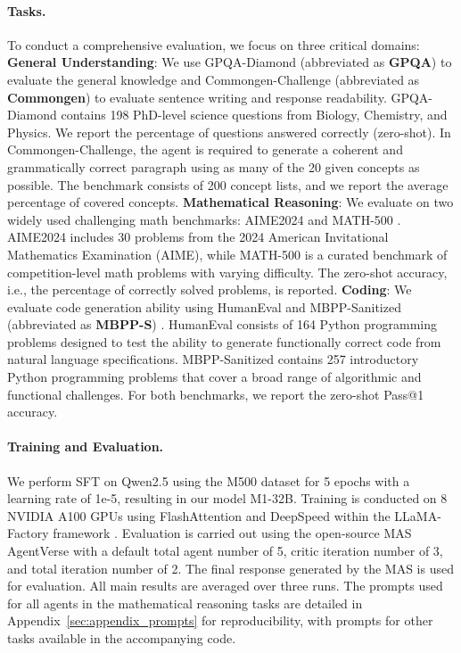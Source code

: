 \paragraph{Tasks.} To conduct a comprehensive evaluation, we focus on three critical domains:  \textbf{General Understanding}: We use GPQA-Diamond (abbreviated as \textbf{GPQA}) \citep{gpqa}  to evaluate the general knowledge and  Commongen-Challenge (abbreviated as \textbf{Commongen}) \citep{self-refine} to evaluate sentence writing and response readability.  GPQA-Diamond contains 198 PhD-level science questions from Biology, Chemistry, and Physics. We report the percentage of questions answered correctly (zero-shot). In Commongen-Challenge, the agent is required to generate a coherent and grammatically correct paragraph using as many of the 20 given concepts as possible. The benchmark consists of 200 concept lists, and we report the average percentage of covered concepts.  \textbf{Mathematical Reasoning}: We evaluate on two widely used challenging math benchmarks: AIME2024 \citep{aime2024} and MATH-500 \citep{math}. AIME2024 includes 30 problems from the 2024 American Invitational Mathematics Examination (AIME), while MATH-500 is a curated benchmark of competition-level math problems with varying difficulty. The zero-shot accuracy, i.e., the percentage of correctly solved problems, is reported.  \textbf{Coding}: We evaluate code generation ability using HumanEval \citep{humaneval} and MBPP-Sanitized (abbreviated as \textbf{MBPP-S}) \citep{mbpp}. HumanEval consists of 164 Python programming problems designed to test the ability to generate functionally correct code from natural language specifications. MBPP-Sanitized contains 257 introductory Python programming problems that cover a broad range of algorithmic and functional challenges. For both benchmarks, we report the zero-shot Pass@1 accuracy.

\paragraph{Training and Evaluation.} We perform SFT on Qwen2.5 using the M500 dataset for 5 epochs with a learning rate of 1e-5, resulting in our model M1-32B. Training is conducted on 8 NVIDIA A100 GPUs using FlashAttention \citep{flashattention} and DeepSpeed \citep{deepspeed} within the LLaMA-Factory framework \citep{llamafactory}. Evaluation is carried out using the open-source MAS AgentVerse with a default total agent number of 5, critic iteration number of 3, and total iteration number of 2. The final response generated by the MAS is used for evaluation. All main results are averaged over three runs. The prompts used for all agents in the mathematical reasoning tasks are detailed in Appendix~\ref{sec:appendix_prompts} for reproducibility, with prompts for other tasks available in the accompanying code.

